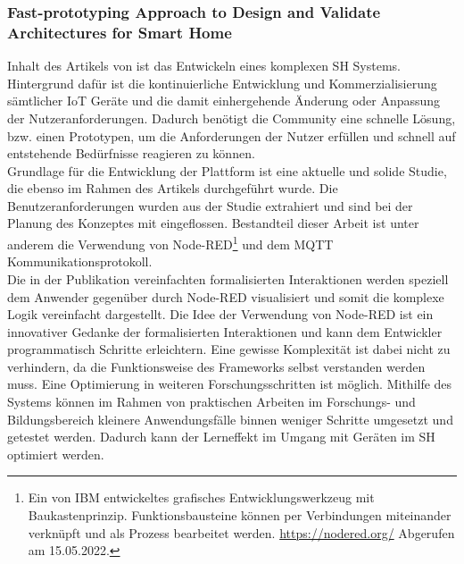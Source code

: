         \subsubsection*{Fast-prototyping Approach to Design and Validate Architectures for Smart Home}  
            Inhalt des Artikels von \cite{Montanaro2021} ist das Entwickeln eines komplexen \acl{SH} Systems. 
            Hintergrund dafür ist die kontinuierliche Entwicklung und Kommerzialisierung sämtlicher \acs{IoT} Geräte und 
            die damit einhergehende Änderung oder Anpassung der Nutzeranforderungen. Dadurch benötigt die Community eine 
            schnelle Lösung, bzw. einen Prototypen, um die Anforderungen der Nutzer erfüllen und schnell auf 
            entstehende Bedürfnisse reagieren zu können. 
            \\
            Grundlage für die Entwicklung der Plattform ist eine aktuelle und solide Studie, die ebenso im Rahmen des 
            Artikels durchgeführt wurde. Die Benutzeranforderungen wurden aus der Studie extrahiert und sind bei der 
            Planung des Konzeptes mit eingeflossen. Bestandteil dieser Arbeit ist unter anderem die Verwendung von Node-RED\footnote{Ein von IBM entwickeltes grafisches Entwicklungswerkzeug mit Baukastenprinzip. Funktionsbausteine können per Verbindungen miteinander verknüpft und als Prozess bearbeitet werden. \url{https://nodered.org/} Abgerufen am 15.05.2022.} und 
            dem \acs{MQTT} Kommunikationsprotokoll. 
            \\
            \linebreak
            Die in der Publikation vereinfachten formalisierten Interaktionen werden speziell dem Anwender gegenüber durch 
            Node-RED visualisiert und somit die komplexe Logik vereinfacht dargestellt. Die Idee der Verwendung von Node-RED 
            ist ein innovativer Gedanke der formalisierten Interaktionen und kann dem Entwickler programmatisch Schritte 
            erleichtern. Eine gewisse Komplexität ist dabei nicht zu verhindern, da die Funktionsweise des Frameworks selbst 
            verstanden werden muss.  
            Eine Optimierung in weiteren Forschungsschritten ist möglich.
            Mithilfe des Systems können im Rahmen von praktischen Arbeiten im Forschungs- und Bildungsbereich kleinere Anwendungsfälle binnen 
            weniger Schritte umgesetzt und getestet werden. Dadurch kann der Lerneffekt im Umgang mit Geräten im \acl{SH} optimiert werden. 
    \\
    \linebreak
